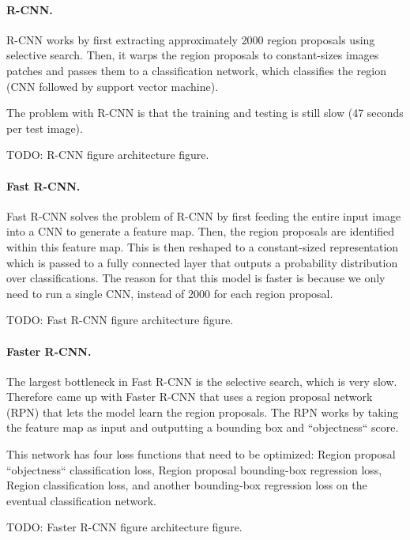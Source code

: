\paragraph{R-CNN.}

R-CNN \citep{girshick2014rich} works by first extracting approximately 2000
region proposals using selective search. Then, it warps the region proposals to
constant-sizes images patches and passes them to a classification network,
which classifies the region (CNN followed by support vector machine).

The problem with R-CNN is that the training and testing is still slow (47
seconds per test image).

TODO: R-CNN figure architecture figure.

\paragraph{Fast R-CNN.}

Fast R-CNN \citep{girshick2015fast} solves the problem of R-CNN by first
feeding the entire input image into a CNN to generate a feature map. Then, the
region proposals are identified within this feature map. This is then reshaped
to a constant-sized representation which is passed to a fully connected layer
that outputs a probability distribution over classifications. The reason for
that this model is faster is because we only need to run a single CNN, instead
of 2000 for each region proposal.

TODO: Fast R-CNN figure architecture figure.

\paragraph{Faster R-CNN.} 

The largest bottleneck in Fast R-CNN is the selective search, which is very
slow. Therefore \citet{ren2015faster} came up with Faster R-CNN that uses a
region proposal network (RPN) that lets the model learn the region proposals.
The RPN works by taking the feature map as input and outputting a bounding box
and ``objectness`` score.

This network has four loss functions that need to be optimized: Region proposal
``objectness`` classification loss, Region proposal bounding-box regression
loss, Region classification loss, and another bounding-box regression loss on
the eventual classification network.

TODO: Faster R-CNN figure architecture figure.

